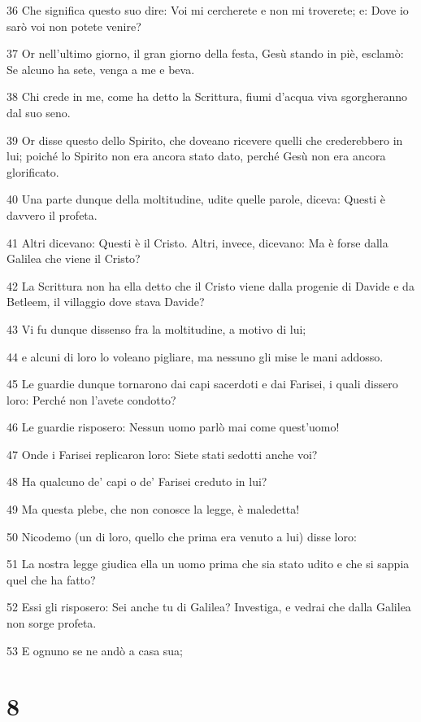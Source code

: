 \par 36 Che significa questo suo dire: Voi mi cercherete e non mi troverete; e: Dove io sarò voi non potete venire?
\par 37 Or nell'ultimo giorno, il gran giorno della festa, Gesù stando in piè, esclamò: Se alcuno ha sete, venga a me e beva.
\par 38 Chi crede in me, come ha detto la Scrittura, fiumi d'acqua viva sgorgheranno dal suo seno.
\par 39 Or disse questo dello Spirito, che doveano ricevere quelli che crederebbero in lui; poiché lo Spirito non era ancora stato dato, perché Gesù non era ancora glorificato.
\par 40 Una parte dunque della moltitudine, udite quelle parole, diceva: Questi è davvero il profeta.
\par 41 Altri dicevano: Questi è il Cristo. Altri, invece, dicevano: Ma è forse dalla Galilea che viene il Cristo?
\par 42 La Scrittura non ha ella detto che il Cristo viene dalla progenie di Davide e da Betleem, il villaggio dove stava Davide?
\par 43 Vi fu dunque dissenso fra la moltitudine, a motivo di lui;
\par 44 e alcuni di loro lo voleano pigliare, ma nessuno gli mise le mani addosso.
\par 45 Le guardie dunque tornarono dai capi sacerdoti e dai Farisei, i quali dissero loro: Perché non l'avete condotto?
\par 46 Le guardie risposero: Nessun uomo parlò mai come quest'uomo!
\par 47 Onde i Farisei replicaron loro: Siete stati sedotti anche voi?
\par 48 Ha qualcuno de' capi o de' Farisei creduto in lui?
\par 49 Ma questa plebe, che non conosce la legge, è maledetta!
\par 50 Nicodemo (un di loro, quello che prima era venuto a lui) disse loro:
\par 51 La nostra legge giudica ella un uomo prima che sia stato udito e che si sappia quel che ha fatto?
\par 52 Essi gli risposero: Sei anche tu di Galilea? Investiga, e vedrai che dalla Galilea non sorge profeta.
\par 53 E ognuno se ne andò a casa sua;

\chapter{8}

